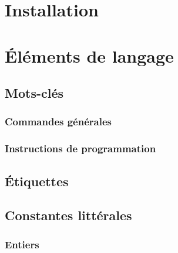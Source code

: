\documentclass[11pt,a4paper,titlepage,openany]{book}
\begin{document}
    \renewcommand\rmdefault{pag}
    \selectfont
    \renewcommand{\sfdefault}{pag}


    \renewcommand{\contentsname}{Sommaire}
    \tableofcontents


    \chapter{Installation}
        

    \chapter{Éléments de langage}
        

        \section{Mots-clés}
            

            \subsection{Commandes générales}
                

            \subsection{Instructions de programmation}
                

        \section{Étiquettes}
            

        \section{Constantes littérales}
             

             \subsection{Entiers}
                
\end{document}
